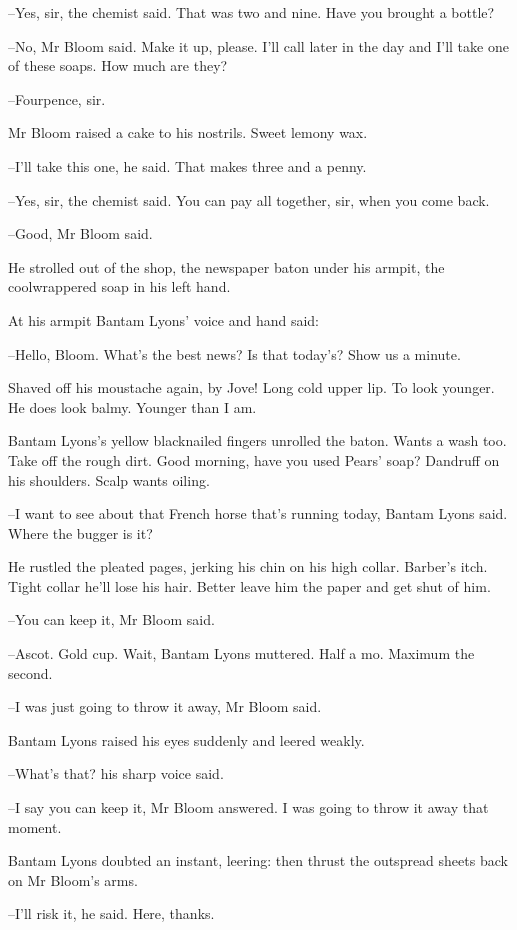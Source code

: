 --Yes, sir,
the chemist said.
That was two and nine.
Have you brought a bottle?

--No,
Mr Bloom said.
Make it up, please.
I'll call later in the day
and I'll take one of these soaps.
How much are they?

--Fourpence, sir.

Mr Bloom raised a cake to his nostrils.
Sweet lemony wax.

--I'll take this one,
he said.
That makes three and a penny.

--Yes, sir,
the chemist said.
You can pay all together, sir, when you come back.

--Good,
Mr Bloom said.

He strolled out of the shop,
the newspaper baton under his armpit,
the coolwrappered soap in his left hand.

At his armpit
Bantam Lyons' voice and hand said:

--Hello, Bloom.
What's the best news?
Is that today's?
Show us a minute.

Shaved off his moustache again, by Jove!
Long cold upper lip.
To look younger.
He does look balmy.
Younger than I am.

Bantam Lyons's yellow blacknailed fingers unrolled the baton.
Wants a wash too.
Take off the rough dirt.
Good morning, have you used Pears' soap?
Dandruff on his shoulders.
Scalp wants oiling.

--I want to see about that French horse that's running today,
Bantam Lyons said.
Where the bugger is it?

He rustled the pleated pages,
jerking his chin on his high collar.
Barber's itch.
Tight collar he'll lose his hair.
Better leave him the paper and get shut of him.

--You can keep it,
Mr Bloom said.

--Ascot.
Gold cup.
Wait,
Bantam Lyons muttered.
Half a mo.
Maximum the second.

--I was just going to throw it away,
Mr Bloom said.

Bantam Lyons raised his eyes suddenly and leered weakly.

--What's that?
his sharp voice said.

--I say you can keep it,
Mr Bloom answered.
I was going to throw it away that moment.

Bantam Lyons doubted an instant, leering:
then thrust the outspread sheets back on Mr Bloom's arms.

--I'll risk it,
he said.
Here, thanks.


